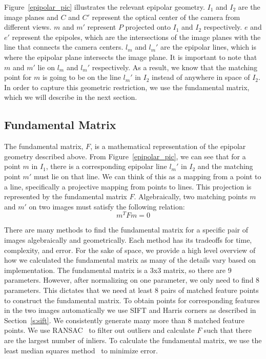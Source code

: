 Figure~\ref{epipolar_pic} illustrates the relevant epipolar geometry. $I_1$ and $I_2$ are the image planes and $C$ and $C'$ represent the optical center of the camera from different views. $m$ and $m'$ represent $P$ projected onto $I_1$ and $I_2$ respectively. $e$ and $e'$ represent the epipoles, which are the intersections of the image planes with the line that connects the camera centers. $l_m$ and $l_m'$ are the epipolar lines, which is where the epipolar plane intersects the image plane. It is important to note that $m$ and $m'$ lie on $l_m$ and $l_m'$ respectively. As a result, we know that the matching point for $m$ is going to be on the line $l_m'$ in $I_2$ instead of anywhere in space of $I_2$. In order to capture this geometric restriction, we use the fundamental matrix, which we will describe in the next section.

\subsection{Fundamental Matrix}
The fundamental matrix, $F$, is a mathematical representation of the epipolar geometry described above. From Figure~\ref{epipolar_pic}, we can see that for a point $m$ in $I_1$, there is a corresponding epipolar line $l_m'$ in $I_2$ and the matching point $m'$ must lie on that line. We can think of this as a mapping from a point to a line, specifically a projective mapping from points to lines. This projection is represented by the fundamental matrix $F$. Algebraically, two matching points $m$ and $m'$ on two images must satisfy the following relation:
\begin{equation}
m^TFm = 0
\end{equation}

There are many methods to find the fundamental matrix for a specific pair of images algebraically and geometrically. Each method has its tradeoffs for time, complexity, and error. For the sake of space, we provide a high level overview of how we calculated the fundamental matrix as many of the details vary based on implementation. The fundamental matrix is a 3x3 matrix, so there are 9 parameters. However, after normalizing on one parameter, we only need to find 8 parameters. This dictates that we need at least 8 pairs of matched feature points to construct the fundamental matrix. To obtain points for corresponding features in the two images automatically we use SIFT and Harris corners as described in Section~\ref{s:sift}. We consistently generate many more than 8 matched feature points. We use RANSAC~\cite{ransac} to filter out outliers and calculate $F$ such that there are the largest number of inliers. To calculate the fundamental matrix, we use the least median squares method~\cite{lms_zhang} to minimize error. 

